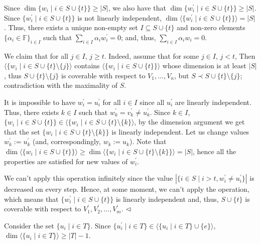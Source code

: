 Since $\dim\{w_{i}\mid i\in S\cup\{t\}\}\geq|S|$, we also have that $\dim\{w^{\prime}_{i}\mid i\in S\cup\{t\}\}\geq|S|$. Since $\{w_{i}^{\prime}\mid i\in S\cup\{t\}\}$ is not linearly independent, $\dim\langle\{w^{\prime}_{i}\mid i\in S\cup\{t\}\}\rangle=|S|$. Thus, there exists a unique non-empty set $I\subseteq S\cup\{t\}$ and non-zero elements $\{\alpha_{i}\in\mathbb{F}\}_{i\in I}$ such that $\sum_{i\in I}\alpha_{i}w^{\prime}_{i}=0$; and, thus, $\sum_{i\in I}\alpha_{i}w_{i}=0$.\par



We claim that for all $j\in I$, $j\geq t$. Indeed, assume that for some $j\in I$, $j<t$, Then $\langle\{w_{i}\mid i\in S\cup\{t\}\setminus\{j\}\rangle$ contains $\langle\{w_{i}\mid i\in S\cup\{t\}\}\rangle$ whose dimension is at least $|S|$, thus $S\cup\{t\}\setminus\{j\}$ is coverable with respect to $V_{1},\dots,V_{n}$, but $S\prec S\cup\{t\}\setminus\{j\}$; contradiction with the maximality of $S$.\par



It is impossible to have $w^{\prime}_{i}=u^{\prime}_{i}$ for all $i\in I$ since all $u^{\prime}_{i}$ are linearly independent. Thus, there exists $k\in I$ such that $w^{\prime}_{k}=v^{\prime}_{k}\neq u^{\prime}_{k}$. Since $k\in I$, $\{w_{i}\mid i\in S\cup\{t\}\}\in\langle\{w_{i}\mid i\in S\cup\{t\}\setminus\{k\}\rangle$,
by the dimension argument we get that the set $\{w_{i}\mid i\in S\cup\{t\}\setminus\{k\}\}$ is linearly independent. Let us change values $w^{\prime}_{k}:=u^{\prime}_{k}$ (and, correspondingly, $w_{k}:=u_{k}$). Note that $\dim\langle\{w_{i}\mid i\in S\cup\{t\}\}\rangle\geq\dim\langle\{w_{i}\mid i\in
S\cup\{t\}\setminus\{k\}\}\rangle=|S|$, hence all the properties are satisfied for new values of $w_{i}^{\prime}$.\par



We can’t apply this operation infinitely since the value $|\{i\in S\mid i>t,w_{i}^{\prime}\neq u_{i}^{\prime}\}|$ is decreased on every step. Hence, at some moment, we can’t apply the operation, which means that $\{w^{\prime}_{i}\mid i\in S\cup\{t\}\}$ is linearly independent and, thus, $S\cup\{t\}$ is coverable with respect to $V_{1}^{\prime},V_{2}^{\prime},\dots,V_{m}^{\prime}$.
$\hfill\vartriangleleft$\par



Consider the set $\{u_{i}\mid i\in T\}$. Since $\{u^{\prime}_{i}\mid i\in T\}\in\langle\{u_{i}\mid i\in T\}\cup\{e\}\rangle$, $\dim\langle\{u_{i}\mid i\in T\}\rangle\geq|T|-1$.\par



